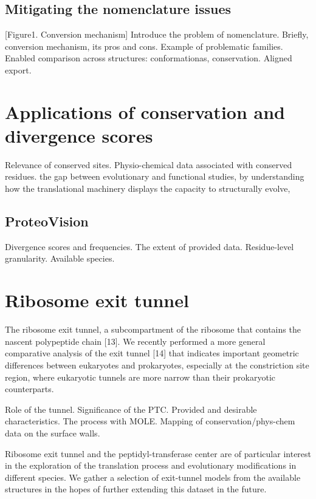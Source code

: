 \documentclass[11pt]{article}
\begin{document}
\subsection{Mitigating the nomenclature issues}
[Figure1. Conversion mechanism]
Introduce the problem of nomenclature. Briefly, conversion mechanism, its pros and cons. Example of problematic families.
Enabled comparison across structures: conformationas, conservation. Aligned export.




\section{Applications of conservation and divergence scores}
Relevance of conserved sites. Physio-chemical data associated with conserved residues.
%
the gap between evolutionary and functional studies, by understanding how the translational machinery displays the
capacity to structurally evolve,

\subsection{ProteoVision}

Divergence scores and frequencies.
The extent of provided data. 
Residue-level granularity. Available species.


\section{Ribosome exit tunnel}

The ribosome exit tunnel, a subcompartment of the ribosome that contains the nascent polypeptide chain [13]. We recently performed a more general comparative analysis of the exit tunnel [14] that indicates important geometric differences between eukaryotes and prokaryotes, especially at the constriction site region, where eukaryotic tunnels are more narrow than their prokaryotic counterparts.

Role of the tunnel. Significance of the PTC. Provided and desirable characteristics.
The process with MOLE. Mapping of conservation/phys-chem data on the surface walls.

Ribosome exit tunnel and the peptidyl-transferase center are of particular interest in the exploration of the translation process and evolutionary modifications in different species. We gather a selection of exit-tunnel models from the available structures in the hopes of further extending this dataset in the future.
\end{document}
